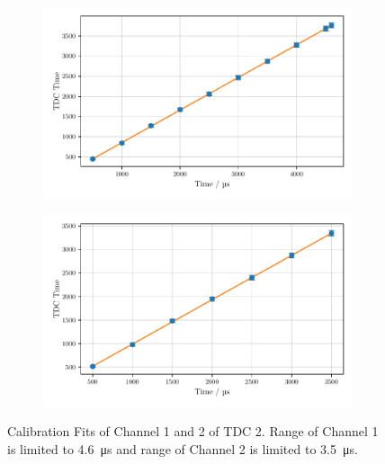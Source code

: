 \begin{figure}
    \centering
    \begin{subfigure}[b]{0.48\textwidth}
        \includegraphics[width=\textwidth]{plots/tdc8.pdf}
    \end{subfigure}\hfill
    \begin{subfigure}[b]{0.48\textwidth}
        \includegraphics[width=\textwidth]{plots/tdc9.pdf}
    \end{subfigure}
    \caption{Calibration Fits of Channel 1 and 2 of TDC 2. 
    Range of Channel 1 is limited to \SI{4.6}{\micro\second} and range of Channel 2 is limited to \SI{3.5}{\micro\second}.}
    \label{fig:tdc89}
\end{figure}
